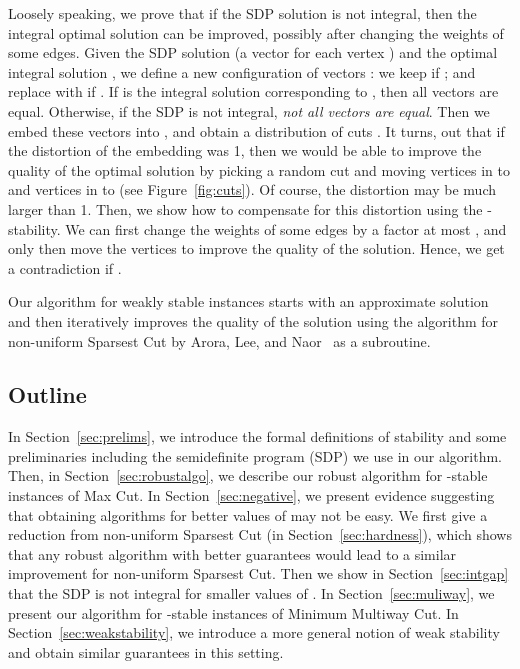 \documentclass[twoside,leqno,twocolumn]{article}
\begin{document}
Loosely speaking, we prove that if the SDP solution is not integral, then the integral optimal solution can be improved,
possibly after changing the weights of some \ifSODA\linebreak \newpage\noindent\fi edges.
Given the SDP solution  (a vector  for each vertex ) and the optimal integral solution ,
we define a new configuration of vectors : we keep  if ; and replace 
with  if . If  is the integral solution corresponding to ,
then all vectors  are equal. Otherwise, if the SDP is not integral, \textit{not all vectors  are equal}. Then we embed 
these vectors into , and obtain a distribution
of cuts . It turns, out that if the distortion of the embedding was 1, then we would be able to 
improve the quality of the optimal solution by picking a random cut  and moving vertices in  to  and vertices in  to 
(see Figure~\ref{fig:cuts}). Of course, the distortion may be much larger than 1. Then, we show how to compensate
for this distortion using the -stability.
We can first change the weights of some edges by a factor at most , and only then 
move the vertices to improve the quality of the solution. Hence, we get a contradiction if .

Our algorithm for weakly stable instances starts with an approximate solution and then iteratively improves the quality of the solution 
using the algorithm for non-uniform Sparsest Cut by Arora, Lee, and Naor~\cite{ALN} as a subroutine.

\subsection{Outline}
In Section~\ref{sec:prelims}, we introduce the formal definitions of stability and some preliminaries including the semidefinite program (SDP) we use in our algorithm. Then, in Section~\ref{sec:robustalgo}, we describe our robust algorithm for -stable instances of Max Cut. 
In Section~\ref{sec:negative}, we present evidence suggesting that obtaining algorithms for better values of  may not be easy. We first give a reduction from non-uniform Sparsest Cut (in Section~\ref{sec:hardness}), which shows that any robust algorithm with better guarantees would lead to a similar improvement for non-uniform Sparsest Cut. Then we show in Section~\ref{sec:intgap} that the SDP is not integral for smaller values of . 
In Section~\ref{sec:muliway}, we present our algorithm for -stable instances of Minimum Multiway Cut.
In Section~\ref{sec:weakstability}, we introduce a more general notion of weak stability and obtain similar guarantees in
this setting. 
\end{document}
